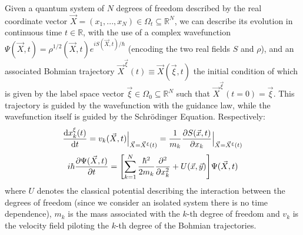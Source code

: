 \documentclass[11pt, a4paper]{article} %
\newcommand{\R}{\mathbb{R}} %
\begin{document}
Given a quantum system of $N$ degrees of freedom described by the real coordinate vector $\vec{X}=(x_1,...,x_N)\in\Omega_t\subseteq\R^N$, we can describe its evolution in continuous time $t\in\R$, with the use of a complex wavefunction $\Psi(\vec{X},t)=\rho^{1/2}(\vec{X},t)e^{iS(\vec{X},t)/\hbar}$ (encoding the two real fields $S$ and $\rho$), and an associated Bohmian trajectory $\vec{X}^{\vec{\xi}}(t)\equiv \vec{X}(\vec{\xi},t)$ the initial condition of which is given by the label space vector $\vec{\xi}\in\Omega_0\subseteq\R^N$ such that $\vec{X}^{\vec{\xi}}(t=0)=\vec{\xi}$. This trajectory is guided by the wavefunction with the guidance law, while the wavefunction itself is guided by the Schrödinger Equation. Respectively:
\begin{equation}\label{GL}
\dv{x_k^\xi(t)}{t} = v_k(\vec{X},t)\Big\rvert_{\vec{X}=\vec{X}^\xi(t)}=\frac{1}{m_k} \pdv{S(\vec{x},t)}{x_k}\Big\rvert_{\vec{X}=\vec{X}^\xi(t)}
\end{equation}
\begin{equation}\label{SE}
i\hbar\pdv{\Psi(\vec{X},t)}{t}=\qty[ \sum_{k=1}^N \frac{\hbar^2}{2m_k}\pdv[2]{}{x_k}+U(\vec{x},\vec{y})]\Psi(\vec{X},t)
\end{equation}
where $U$ denotes the classical potential describing the interaction between the degrees of freedom (since we consider an isolated system there is no time dependence), $m_k$ is the mass associated with the $k$-th degree of freedom and $v_k$ is the velocity field piloting the $k$-th degree of the Bohmian trajectories.
\end{document}
